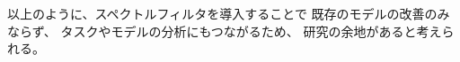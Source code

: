 \documentclass{jsarticle}
\begin{document}
以上のように、スペクトルフィルタを導入することで
既存のモデルの改善のみならず、
タスクやモデルの分析にもつながるため、
研究の余地があると考えられる。








\end{document}
